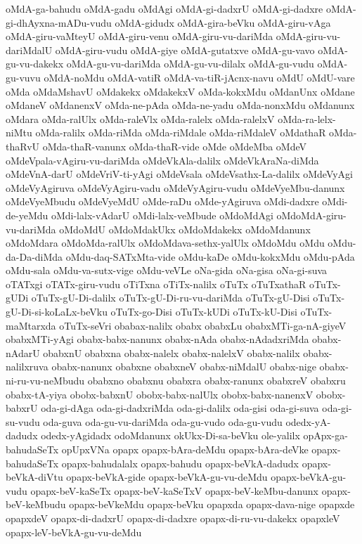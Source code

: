 {oMdA-ga-bahudu
oMdA-gadu
oMdAgi
oMdA-gi-dadxrU
oMdA-gi-dadxre
oMdA-gi-dhAyxna-mADu-vudu
oMdA-gidudx
oMdA-gira-beVku
oMdA-giru-vAga
oMdA-giru-vaMteyU
oMdA-giru-venu
oMdA-giru-vu-dariMda
oMdA-giru-vu-dariMdalU
oMdA-giru-vudu
oMdA-giye
oMdA-gutatxve
oMdA-gu-vavo
oMdA-gu-vu-dakekx
oMdA-gu-vu-dariMda
oMdA-gu-vu-dilalx
oMdA-gu-vudu
oMdA-gu-vuvu
oMdA-noMdu
oMdA-vatiR
oMdA-va-tiR-jAcnx-navu
oMdU
oMdU-vare
oMda
oMdaMshavU
oMdakekx
oMdakekxV
oMda-kokxMdu
oMdanUnx
oMdane
oMdaneV
oMdanenxV
oMda-ne-pAda
oMda-ne-yadu
oMda-nonxMdu
oMdanunx
oMdara
oMda-ralUlx
oMda-raleVlx
oMda-ralelx
oMda-ralelxV
oMda-ra-lelx-niMtu
oMda-ralilx
oMda-riMda
oMda-riMdale
oMda-riMdaleV
oMdathaR
oMda-thaRvU
oMda-thaR-vanunx
oMda-thaR-vide
oMde
oMdeMba
oMdeV
oMdeVpala-vAgiru-vu-dariMda
oMdeVkAla-dalilx
oMdeVkAraNa-diMda
oMdeVnA-darU
oMdeVriV-ti-yAgi
oMdeVsala
oMdeVsathx-La-dalilx
oMdeVyAgi
oMdeVyAgiruva
oMdeVyAgiru-vadu
oMdeVyAgiru-vudu
oMdeVyeMbu-danunx
oMdeVyeMbudu
oMdeVyeMdU
oMde-raDu
oMde-yAgiruva
oMdi-dadxre
oMdi-de-yeMdu
oMdi-lalx-vAdarU
oMdi-lalx-veMbude
oMdoMdAgi
oMdoMdA-giru-vu-dariMda
oMdoMdU
oMdoMdakUkx
oMdoMdakekx
oMdoMdanunx
oMdoMdara
oMdoMda-ralUlx
oMdoMdava-sethx-yalUlx
oMdoMdu
oMdu
oMdu-da-Da-diMda
oMdu-daq-SATxMta-vide
oMdu-kaDe
oMdu-kokxMdu
oMdu-pAda
oMdu-sala
oMdu-va-sutx-vige
oMdu-veVLe
oNa-gida
oNa-gisa
oNa-gi-suva
oTATxgi
oTATx-giru-vudu
oTiTxna
oTiTx-nalilx
oTuTx
oTuTxathaR
oTuTx-gUDi
oTuTx-gU-Di-dalilx
oTuTx-gU-Di-ru-vu-dariMda
oTuTx-gU-Disi
oTuTx-gU-Di-si-koLaLx-beVku
oTuTx-go-Disi
oTuTx-kUDi
oTuTx-kU-Disi
oTuTx-maMtarxda
oTuTx-seVri
obabax-nalilx
obabx
obabxLu
obabxMTi-ga-nA-giyeV
obabxMTi-yAgi
obabx-babx-nanunx
obabx-nAda
obabx-nAdadxriMda
obabx-nAdarU
obabxnU
obabxna
obabx-nalelx
obabx-nalelxV
obabx-nalilx
obabx-nalilxruva
obabx-nanunx
obabxne
obabxneV
obabx-niMdalU
obabx-nige
obabx-ni-ru-vu-neMbudu
obabxno
obabxnu
obabxra
obabx-ranunx
obabxreV
obabxru
obabx-tA-yiya
obobx-babxnU
obobx-babx-nalUlx
obobx-babx-nanenxV
obobx-babxrU
oda-gi-dAga
oda-gi-dadxriMda
oda-gi-dalilx
oda-gisi
oda-gi-suva
oda-gi-su-vudu
oda-guva
oda-gu-vu-dariMda
oda-gu-vudo
oda-gu-vudu
odedx-yA-dadudx
odedx-yAgidadx
odoMdanunx
okUkx-Di-sa-beVku
ole-yalilx
opApx-ga-bahudaSeTx
opUpxVNa
opapx
opapx-bAra-deMdu
opapx-bAra-deVke
opapx-bahudaSeTx
opapx-bahudalalx
opapx-bahudu
opapx-beVkA-dadudx
opapx-beVkA-diVtu
opapx-beVkA-gide
opapx-beVkA-gu-vu-deMdu
opapx-beVkA-gu-vudu
opapx-beV-kaSeTx
opapx-beV-kaSeTxV
opapx-beV-keMbu-danunx
opapx-beV-keMbudu
opapx-beVkeMdu
opapx-beVku
opapxda
opapx-dava-nige
opapxde
opapxdeV
opapx-di-dadxrU
opapx-di-dadxre
opapx-di-ru-vu-dakekx
opapxleV
opapx-leV-beVkA-gu-vu-deMdu
}
